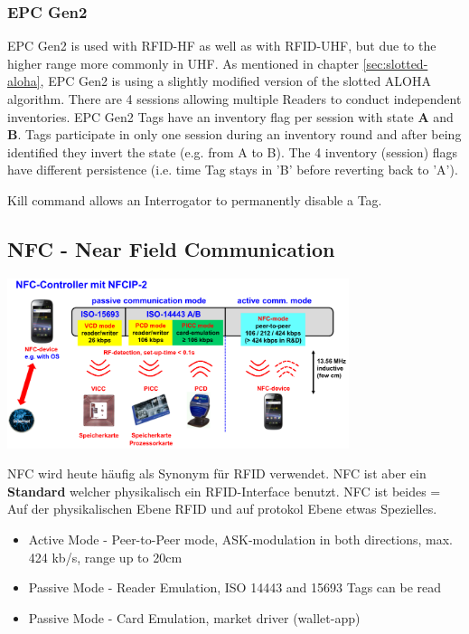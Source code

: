 \subsubsection{EPC Gen2}
	EPC Gen2 is used with RFID-HF as well as with RFID-UHF, but due to the higher range more commonly in UHF.
	As mentioned in chapter \ref{sec:slotted-aloha}, EPC Gen2 is using a slightly modified version of the slotted ALOHA algorithm.
	There are 4 sessions allowing multiple Readers to conduct independent inventories. EPC Gen2 Tags have an inventory flag per session
	with state \textbf{A} and \textbf{B}. Tags participate in only one session during an inventory round and after being identified they 
	invert the state (e.g. from A to B). The 4 inventory (session) flags have different persistence (i.e. time Tag stays in 'B' before
	reverting back to 'A').
	
	Kill command allows an Interrogator to permanently disable a Tag.
	
\subsection{NFC - Near Field Communication}
	
	\begin{minipage}{10cm}
		\includegraphics[width=10cm]{./bilder/rfid-nfc.png} 
	\end{minipage}
			
	NFC wird heute häufig als Synonym für RFID verwendet. NFC ist aber ein \textbf{Standard} welcher physikalisch ein RFID-Interface benutzt. 
	NFC ist beides = Auf der physikalischen Ebene RFID und auf protokol Ebene etwas Spezielles.
	\begin{itemize}
		\item Active Mode - Peer-to-Peer mode, ASK-modulation in both directions, max. 424 kb/s, range up to 20cm
		\item Passive Mode - Reader Emulation, ISO 14443 and 15693 Tags can be read
		\item Passive Mode - Card Emulation, market driver (wallet-app)
	\end{itemize}
	
	